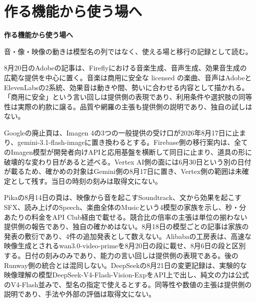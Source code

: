 \section{作る機能から使う場へ}
\begin{wideflow}
{\Large\bfseries 作る機能から使う場へ}\par
\smallskip
{\color{SurveyMuted}音・像・映像の動きは模型名の列ではなく、使える場と移行の記録として読む。}\par
\end{wideflow}

\noindent 8月20日のAdobeの記事は、Fireflyにおける音楽生成、音声生成、効果音生成の広範な提供を中心に置く。音楽は商用に安全な licensed の楽曲、音声はAdobeとElevenLabsの2系統、効果音は動きや間、勢いに合わせる内容として描かれる。「商用に安全」という言い回しは提供側の表現であり、利用条件や選択肢の同等性は実際の約款に譲る。品質や網羅の主張も提供側の説明であり、独自の試しはない。 \cite{w2026w34w34eventc091}\par\medskip

\noindent Googleの廃止頁は、Imagen 4の3つの一般提供の受け口が2026年8月17日に止まり、gemini-3.1-flash-imageに置き換わるとする。Firebase側の移行案内は、全てのImagen模型が開発者向けAPIと応用基盤を横断して同日に止まり、道具の形に破壊的な変わり目があると述べる。Vertex AI側の面には6月30日という別の日付が載るため、確かめの対象はGemini側の8月17日に置き、Vertex側の範囲は未確定として残す。当日の時刻の刻みは取得文にない。 \cite{w2026w34w34eventc018}\par\medskip

\noindent Pikaの8月14日の頁は、映像から音を起こすSoundtrack、文から効果を起こすSFX、読み上げのSpeech、楽曲全体のMusicという4模型の家族を示し、秒・分あたりの料金をAPI Club経由で載せる。競合比の倍率の主張は単位の揃わない提供側の報告であり、独自の確かめはない。8月18日の模型ごとの記事は家族の発表の敷衍であり、4件の追加発表として数えない。Alibabaの工房表は、高速な映像生成とされるwan3.0-video-primeを8月20日の段に載せ、8月6日の段と区別する。日付の刻みのみであり、能力の言い回しは提供側の表現である。後のRunway側の統合とは混同しない。DeepSeekの8月21日の変更記録は、実験的な映像理解の模型DeepSeek-V4-Flash-Vision-ExpをAPI上で出し、純文の力は公式のV4-Flash並みで、型名の指定で使えるとする。同等性や数値の主張は提供側の説明であり、手法や外部の評価は取得文にない。 \cite{w2026w34w34eventc020,w2026w34w34eventgapalibabawan30modelstudio,w2026w34w34eventc022}\par\medskip

